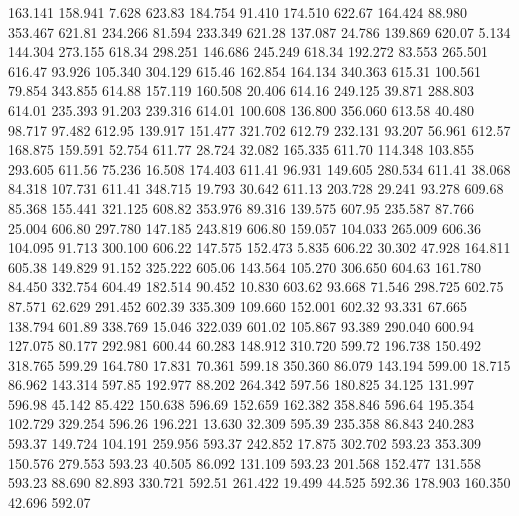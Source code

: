  163.141  158.941    7.628       623.83
 184.754   91.410  174.510       622.67
 164.424   88.980  353.467       621.81
 234.266   81.594  233.349       621.28
 137.087   24.786  139.869       620.07
   5.134  144.304  273.155       618.34
 298.251  146.686  245.249       618.34
 192.272   83.553  265.501       616.47
  93.926  105.340  304.129       615.46
 162.854  164.134  340.363       615.31
 100.561   79.854  343.855       614.88
 157.119  160.508   20.406       614.16
 249.125   39.871  288.803       614.01
 235.393   91.203  239.316       614.01
 100.608  136.800  356.060       613.58
  40.480   98.717   97.482       612.95
 139.917  151.477  321.702       612.79
 232.131   93.207   56.961       612.57
 168.875  159.591   52.754       611.77
  28.724   32.082  165.335       611.70
 114.348  103.855  293.605       611.56
  75.236   16.508  174.403       611.41
  96.931  149.605  280.534       611.41
  38.068   84.318  107.731       611.41
 348.715   19.793   30.642       611.13
 203.728   29.241   93.278       609.68
  85.368  155.441  321.125       608.82
 353.976   89.316  139.575       607.95
 235.587   87.766   25.004       606.80
 297.780  147.185  243.819       606.80
 159.057  104.033  265.009       606.36
 104.095   91.713  300.100       606.22
 147.575  152.473    5.835       606.22
  30.302   47.928  164.811       605.38
 149.829   91.152  325.222       605.06
 143.564  105.270  306.650       604.63
 161.780   84.450  332.754       604.49
 182.514   90.452   10.830       603.62
  93.668   71.546  298.725       602.75
  87.571   62.629  291.452       602.39
 335.309  109.660  152.001       602.32
  93.331   67.665  138.794       601.89
 338.769   15.046  322.039       601.02
 105.867   93.389  290.040       600.94
 127.075   80.177  292.981       600.44
  60.283  148.912  310.720       599.72
 196.738  150.492  318.765       599.29
 164.780   17.831   70.361       599.18
 350.360   86.079  143.194       599.00
  18.715   86.962  143.314       597.85
 192.977   88.202  264.342       597.56
 180.825   34.125  131.997       596.98
  45.142   85.422  150.638       596.69
 152.659  162.382  358.846       596.64
 195.354  102.729  329.254       596.26
 196.221   13.630   32.309       595.39
 235.358   86.843  240.283       593.37
 149.724  104.191  259.956       593.37
 242.852   17.875  302.702       593.23
 353.309  150.576  279.553       593.23
  40.505   86.092  131.109       593.23
 201.568  152.477  131.558       593.23
  88.690   82.893  330.721       592.51
 261.422   19.499   44.525       592.36
 178.903  160.350   42.696       592.07
